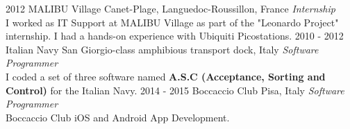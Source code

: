 \documentclass[]{friggeri-cv}
\begin{document}
\begin{entrylist}
\entry
{2012}
{MALIBU Village}
{Canet-Plage, Languedoc-Roussillon, France}
{\emph{Internship} \\
I worked as IT Support at MALIBU Village as part of the "Leonardo Project" internship. I had a hands-on experience with Ubiquiti Picostations.}
\entry
{2010 - 2012}
{Italian Navy}
{San Giorgio-class amphibious transport dock, Italy}
{\emph{Software Programmer} \\
I coded a set of three software named \textbf{A.S.C (Acceptance, Sorting and Control)} for the Italian Navy.}
\entry
{2014 - 2015}
{Boccaccio Club}
{Pisa, Italy}
{\emph{Software Programmer} \\
Boccaccio Club iOS and Android App Development.}
\end{entrylist}

\end{document}

